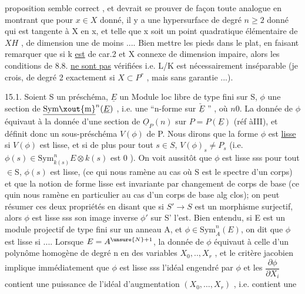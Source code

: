 
proposition semble correct , et devrait se prouver de façon toute analogue
en montrant que pour $x\in X$ donné, il y a une hypersurface  de degré $n\geqslant 2$
donné qui est tangente à X en x, et telle que x soit un point quadratique
élémentaire de $X$\hand{\unsure{$\cap$}}$H$ , de dimension une de moins .... Bien mettre les
pieds dans le plat, en faisant remarquer que si k \uline{est} de car.2 et X
connexe  de dimension impaire, alors les conditions de 8.8. \uline{ne sont pas}
vérifiées i.e. L/K est nécessairement inséparable (je crois, de degré
2 exactement si $X\subset P^r$ , mais sans garantie ...).

15.1. Soient S un préschéma, $\underline{E}$ un Module loc libre de type fini
sur S, $\phi$ une section de $\underline{\mathrm{Sym\xout{m}}}^n(\underline{E})$ , i.e. une ``n-forme sur $\check{\underline{E}}$ '' , où $n$\over{$>$}{\unsure{$\geqslant$}}$0$.
La donnée de $\phi$ équivaut à la donnée d'une section de $\underline{O}_P(n)$ sur $P=P(\underline{E})$
(réf àIII), et définit donc un sous-préschéma $V(\phi)$ de P. Nous dirons que
la forme $\phi$ est \uline{lisse} si $V(\phi)$ est lisse, et si de plus pour tout $s\in S$,
$V(\phi)_s\neq P_s$ (i.e. $\phi(s)\in \mathrm{Sym}^n_{k(s)}E\otimes k(s)$ est \over{$=$}{\unsure{$\neq$}}$0$ ). On voit aussitôt
que $\phi$ est lisse sss pour tout  $\in$S, $\phi(s)$ est lisse, 
(ce qui nous ramène au cas où S est le spectre d'un corps) et
que la notion de forme lisse est invariante par changement de corps de
base (ce quin nous ramène en particulier au cas d'un corps de base alg
clos); on peut résumer ces deux propriétés en disant que si $S'\to S$ est
un morphisme surjectif, alors $\phi$ est lisse sss son image inverse $\phi'$ sur S'
l'est. Bien entendu, si E est un module projectif de type fini sur un
anneau A, et $\phi\in\mathrm{Sym}^n_A(E)$, on dit que $\phi$ est lisse si .... Lorsque $E=A^{\unsure{N}+1}$,
la donnée de $\phi$ équivaut à celle d'un polynôme homogène de degré n
en des variables $X_0,..,X_r$ , et le critère jacobien implique immédiatement
que  $\phi$ est lisse sss l'idéal engendré par $\phi$ et les $\dfrac{\partial\phi}{\partial X_i}$ contient
une puissance de l'idéal d'augmentation $(X_0,\dots,X_r)$ , i.e. contient une

 
